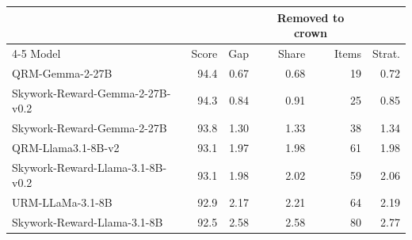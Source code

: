 \begin{tabular}{lrrrrr}
\toprule
& & & \multicolumn{2}{c}{Removed to crown} & \\
\cmidrule(lr){4-5}
Model & Score & Gap & Share & Items & Strat.\\
\midrule
QRM-Gemma-2-27B & 94.4 & 0.67 & 0.68 & 19 & 0.72\\
Skywork-Reward-Gemma-2-27B-v0.2 & 94.3 & 0.84 & 0.91 & 25 & 0.85\\
Skywork-Reward-Gemma-2-27B & 93.8 & 1.30 & 1.33 & 38 & 1.34\\
QRM-Llama3.1-8B-v2 & 93.1 & 1.97 & 1.98 & 61 & 1.98\\
Skywork-Reward-Llama-3.1-8B-v0.2 & 93.1 & 1.98 & 2.02 & 59 & 2.06\\
URM-LLaMa-3.1-8B & 92.9 & 2.17 & 2.21 & 64 & 2.19\\
Skywork-Reward-Llama-3.1-8B & 92.5 & 2.58 & 2.58 & 80 & 2.77\\
\bottomrule
\end{tabular}
